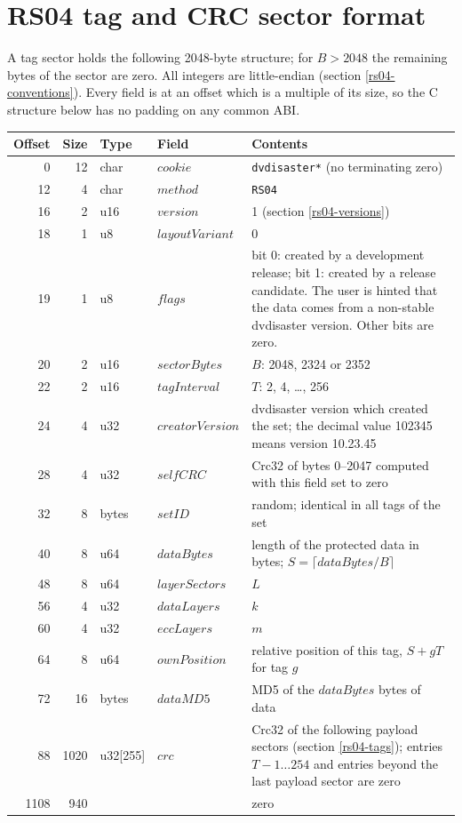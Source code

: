 \newpage
\section{RS04 tag and CRC sector format}
\label{rs04-tag}

A tag sector holds the following 2048-byte structure; for $B > 2048$ the
remaining bytes of the sector are zero. All integers are little-endian
(section \ref{rs04-conventions}). Every field is at an offset which is a
multiple of its size, so the C structure below has no padding on any
common ABI.

\medskip
{\small
\begin{tabular}{|r|r|l|l|p{7.4cm}|}
\hline
Offset & Size & Type & Field & Contents \\
\hline
0 & 12 & char & $cookie$ & {\tt *dvdisaster*} (no terminating zero) \\
12 & 4 & char & $method$ & {\tt RS04} \\
16 & 2 & u16 & $version$ & 1 (section \ref{rs04-versions}) \\
18 & 1 & u8 & $layoutVariant$ & 0 \\
19 & 1 & u8 & $flags$ & bit 0: created by a development release;
  bit 1: created by a release candidate. The user is hinted that the data
  comes from a non-stable dvdisaster version. Other bits are zero. \\
20 & 2 & u16 & $sectorBytes$ & $B$: 2048, 2324 or 2352 \\
22 & 2 & u16 & $tagInterval$ & $T$: 2, 4, \ldots, 256 \\
24 & 4 & u32 & $creatorVersion$ & dvdisaster version which created the set;
  the decimal value 102345 means version 10.23.45 \\
28 & 4 & u32 & $selfCRC$ & Crc32 of bytes 0--2047 computed with this field
  set to zero \\
32 & 8 & bytes & $setID$ & random; identical in all tags of the set \\
40 & 8 & u64 & $dataBytes$ & length of the protected data in bytes;
  $S = \lceil dataBytes/B \rceil$ \\
48 & 8 & u64 & $layerSectors$ & $L$ \\
56 & 4 & u32 & $dataLayers$ & $k$ \\
60 & 4 & u32 & $eccLayers$ & $m$ \\
64 & 8 & u64 & $ownPosition$ & relative position of this tag, $S + gT$ for
  tag $g$ \\
72 & 16 & bytes & $dataMD5$ & MD5 of the $dataBytes$ bytes of data \\
88 & 1020 & u32[255] & $crc$ & Crc32 of the following payload sectors
  (section \ref{rs04-tags}); entries $T-1 \ldots 254$ and entries beyond the
  last payload sector are zero \\
1108 & 940 & & & zero \\
\hline
\end{tabular}
}
\medskip


